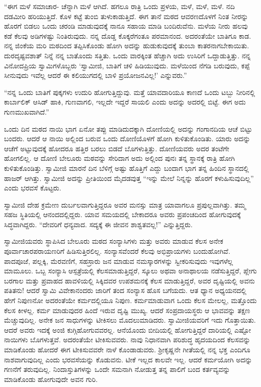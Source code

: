  “ಈಗ ಮಳೆ ಸಮಾಚಾರ- ಚೆನ್ನಾಗಿ ಮಳೆ ಆಗಿದೆ. ಹಗಲೂ ರಾತ್ರಿ ಒಂದು ಪ್ರಳಯ, ಮಳೆ, ಮಳೆ, ಮಳೆ. ನದಿ ದಡಮೀರಿ ಹರಿಯುತ್ತಿದೆ. ಕೊಳ ಕಟ್ಟೆ ತುಂಬಿ ತುಳುಕಾಡುತ್ತಿದೆ. ಈಗ ತಾನೆ ಮಠದ ಆವರಣದೊಳಗೆ ನಿಂತ ನೀರನ್ನು ಹೊರಗೆ ಬಿಡಲು ಒಂದು ಚರಂಡಿ ಮಾಡುವುದಕ್ಕೆ ನಾನೂ ಸಹಾಯ ಮಾಡಿ ಬಂದಿರುವೆನು. ಮಳೆಯ ನೀರು ಹಲವು ಕಡೆ ಕೆಲವು ಅಡಿಗಳಷ್ಟು ನಿಂತಿರುವುದು. ನನ್ನ ದೊಡ್ಡ ಕೊಕ್ಕರೆಗಂತೂ ಪರಮಾನಂದ. ಅದರಂತೆಯೇ ಬಾತಿಗೂ ಕಾಡ. ನನ್ನ ಜಿಂಕೆಯ ಮರಿ ಮಠದಿಂದ ತಪ್ಪಿಸಿಕೊಂಡು ಹೋಗಿ ಅದನ್ನು ಹುಡುಕುವುದಕ್ಕೆ ತುಂಬಾ ಕಾತರನಾಗಬೇಕಾಯಿತು. ದುರದೃಷ್ಟವಶಾತ್ ನಿನ್ನೆ ನನ್ನ ಬಾತೊಂದು ಸತ್ತಿತು. ಒಂದು ವಾರಕ್ಕಿಂತ ಹೆಚ್ಚಾಗಿ ಅದು ಉಸಿರಿಗೆ ಒದ್ದಾಡುತ್ತಿತ್ತು. ನನ್ನ ವಿನೋದಪ್ರಿಯ ಸ್ವಾಮಿಗಳೊಬ್ಬರು ‘ಸ್ವಾಮೀಜಿ, ಬಾತಿಗೆ ಚಳಿ ಹಿಡಿಯುವುದು. ಮಳೆಯಿಂದ ನೆಗಡಿ ಬರುವುದು, ಕಪ್ಪೆ ಸೀನುವುದು ಇವೆಲ್ಲ ಆದರೆ ಈ ಕಲಿಯುಗದಲ್ಲಿ ಬಾಳಿ ಪ್ರಯೋಜನವಿಲ್ಲ!’ ಎನ್ನುವರು.” 

 “ನನ್ನ ಒಂದು ಬಾತಿಗೆ ಪುಕ್ಕಗಳು ಉದುರಿ ಹೋಗುತ್ತಿದ್ದುವು. ಮತ್ತೆ ಯಾವದಾರಿಯೂ ಕಾಣದೆ ಒಂದು ಟಬ್ಬು ನೀರಿನಲ್ಲಿ ಕಾರ್ಬಾಲಿಕ್ ಆಸಿಡ್ ಹಾಕಿ, ಗುಣವಾಗಲಿ, ಇಲ್ಲದೇ ಇದ್ದರೆ ಸಾಯಲಿ ಎಂದು ಅದನ್ನು ಅದರಲ್ಲಿ ಬಿಟ್ಟೆ. ಈಗ ಅದು ಗುಣಮುಖವಾಗಿದೆ.” 

 ಒಂದು ದಿನ ಮಠದ ನಾಯಿ ಭಾಗ ಏನೋ ತಪ್ಪು ಮಾಡಿದುದಕ್ಕಾಗಿ ದೋಣಿಯಲ್ಲಿ ಅದನ್ನು ಗಂಗಾನದಿಯ ಆಚೆ ಬಿಟ್ಟು ಬಂದರು. ಆದರೆ ಆ ನಾಯಿ ಅಲ್ಲಿಂದ ಬರುವ ಒಂದು ದೋಣಿಯೊಳಗೆ ಹೋಗಿ ಕುಳಿತುಕೊಂಡಿತು. ಯಾರು ಅದನ್ನು ಆಚೆಗೆ ಅಟ್ಟುವುದಕ್ಕೆ ಹೋದರೂ ಹತ್ತಿರ ಬರಲು ಬಿಡದೆ ಬೊಗಳುತ್ತಿತ್ತು. ದೋಣಿಯವರು ಅದರ ತಂಟೆಗೇ ಹೋಗಲಿಲ್ಲ. ಆ ದೋಣಿ ಬೇಲೂರು ಮಠವನ್ನು ಸೇರಿದಾಗ ಅದು ಅಲ್ಲಿಂದ ಪುನಃ ತನ್ನ ಸ್ಥಾನಕ್ಕೆ ರಾತ್ರಿ ಹೋಗಿ ಕುಳಿತುಕೊಂಡಿತ್ತು. ಸ್ವಾಮೀಜಿ ಮಾರನೆ ದಿನ ಬೆಳಿಗ್ಗೆ ಅಷ್ಟು ಹೊತ್ತಿಗೆ ಎದ್ದು ಬಂದಾಗ ಭಾಗ ತನ್ನ ಹಿಂದಿನ ಸ್ಥಾನದಲ್ಲಿ ಹಾಜರ್ ಆಗಿತ್ತು. ಸ್ವಾಮೀಜಿ ಅದನ್ನು ಪ್ರೀತಿಯಿಂದ ಮೈದಡವುತ್ತ “ಇನ್ನು ಮೇಲೆ ನಿನ್ನನ್ನು ಹೊರಗೆ ಕಳುಹಿಸುವುದಿಲ್ಲ” ಎಂದು ಭರವಸೆ ಕೊಟ್ಟರು. 

 ಸ್ವಾಮೀಜಿ ದೇಹ ಕ್ರಮೇಣ ದುರ್ಬಲವಾಗುತ್ತಿದ್ದರೂ ಅವರ ಮನಸ್ಸು ಮಾತ್ರ ಯಾವಾಗಲೂ ಪ್ರಪುಲ್ಲವಾಗಿತ್ತು. ತಮ್ಮ ಸಹಜ ಸ್ಥಿತಿಯಲ್ಲಿ ಆನಂದದಲ್ಲಿದ್ದರು. ಯಾವ ಸಮಯದಲ್ಲಿ ಬೇಕಾದರೂ ಅವರು ಪ್ರಪಂಚದಿಂದ ಹೋಗುವುದಕ್ಕೆ ಸಿದ್ಧವಾಗಿದ್ದರು. “ದೇವರಿಗೆ ಧನ್ಯವಾದ. ಸದ್ಯಕ್ಕೆ ಈ ಜೀವನ ಶಾಶ್ವತವಲ್ಲ!” ಎನ್ನುತ್ತಿದ್ದರು. 

 ಸ್ವಾಮೀಜಿಯವರು ಸ್ಥಾಪಿಸಿದ ಬೇಲೂರು ಮಠದ ಸಂನ್ಯಾಸಿಗಳು ಮತ್ತು ಅವರು ಮಾಡುವ ಕೆಲಸ ಅನೇಕ ಪೂರ್ವಾಚಾರಪರಾಯಣರಿಗೆ ಹಿಡಿಸುತ್ತಿರಲಿಲ್ಲ. ಸಂನ್ಯಾಸವೆಂದರೆ ಕೆಲವು ಅಭಿಪ್ರಾಯಗಳು ಬಂದುಹೋಗಿವೆ. ಪಾದಪೂಜೆ, ಪಲ್ಲಕ್ಕಿ, ಮೆರವಣಿಗೆ, ಸಹಸ್ರಾರು ಜನ ಮಾಡುವ ನಮಸ್ಕಾರಗಳನ್ನು ಸ್ವೀಕರಿಸುವುದು ಇವುಗಳೆಲ್ಲ ಮಾಮೂಲು. ಒಬ್ಬ ಸಂನ್ಯಾಸಿ ಆಸ್ಪತ್ರೆಯಲ್ಲಿ ಕೆಲಸಮಾಡುತ್ತಿದ್ದರೆ, ಸ್ಕೂಲು ಅಥವಾ ಅನಾಥಾಲಯ ನಡೆಸುತ್ತಿದ್ದರೆ, ಪ್ಲೇಗು ಬರಗಾಲ ಮತ್ತು ಪ್ರವಾಹದ ಹಾವಳಿಯಲ್ಲಿ ಸಿಕ್ಕಿದವರ ಉಪಶಮನಕ್ಕೆ ಕೆಲಸ ಮಾಡುತ್ತಿದ್ದರೆ, ಅವರ ದೃಷ್ಟಿಯಲ್ಲಿ ಅವನು ಪತಿತನು! ಆದರೆ ಸ್ವಾಮಿ ವಿವೇಕಾನಂದರು ಜಾರಿಗೆ ತಂದ ಸಂನ್ಯಾಸ ಹೊಸ ಬಗೆಯದು. ಆತ ಧ್ಯಾನ ಅಧ್ಯಯನದಲ್ಲಿ ಹೇಗೆ ನಿಪುಣನೋ ಅದರಂತೆಯೇ ಕರ್ಮದಲ್ಲಿಯೂ ನಿಪುಣ. ಕರ್ಮಮಾಡುವಾಗ ಒಂದು ಕೆಲಸ ಮೇಲಲ್ಲ, ಮತ್ತೊಂದು ಕೆಲಸ ಕೀಳಲ್ಲ. ಕರ್ಮ ಮಾಡುವುದರ ಹಿಂದೆ ಇರುವ ದೃಷ್ಟಿ ಮುಖ್ಯ. ಆದರೆ ಸಂಪ್ರದಾಯಸ್ಥರು ಆ ಭಾವವನ್ನು ತಕ್ಷಣ ಮೆಚ್ಚುವುದಿಲ್ಲ. ಅನೇಕ ಜನ ಸಾಧುಗಳನ್ನು ಟೀಕಿಸಲು ಮೊದಲುಮಾಡಿದರು. ಸ್ವಾಮೀಜಿಯವರಿಗೆ ಇದು ಗೊತ್ತಾಯಿತು. ಆದರೆ ಅವರು ಇದಕ್ಕೆ ಅಂಜಿ ಕುಗ್ಗಿಹೋಗುವವರಲ್ಲ. ಆನೆಯೊಂದು ಬೀದಿಯಲ್ಲಿ ಹೋಗುತ್ತಿದ್ದರೆ ದಾರಿಯಲ್ಲಿ ಎಷ್ಟೋ ನಾಯಿಗಳು ಬೊಗಳುತ್ತವೆ. ಅದರಂತೆಯೇ ಟೀಕಿಸುವವರು. ನಾವು ನಿಧಾನವಾಗಿ ಪರಿಶುದ್ಧ ಹೃದಯದಿಂದ ಕೆಲಸವನ್ನು ಮಾಡಿಕೊಂಡು ಹೋದರೆ ಈಗ ಟೀಕಿಸುವವರೇ ನಾಳೆ ಕೊಂಡಾಡುವರು. ಶ‍್ರೀಕೃಷ್ಣನೇ ಗೀತೆಯಲ್ಲಿ ನನ್ನ ಭಕ್ತ ಎಂದಿಗೂ ನಾಶವಾಗುವುದಿಲ್ಲ ಎಂದು ಭರವಸೆಯನ್ನು ಕೊಡುವನು. ಟೀಕೆ ಇಲ್ಲದ ಕಾಲವೇ ಇಲ್ಲ. ಆದರೆ ಕರ್ಮಯೋಗಿ ಅದನ್ನು ಗಣನೆಗೆ ತರುವುದಿಲ್ಲ. ನಿಂದಾಸ್ತುತಿಗಳನ್ನು ಒಂದೇ ಸಮನಾಗಿ ನೋಡುತ್ತ ತನ್ನ ಪಾಲಿಗೆ ಬಂದ ಕರ್ತವ್ಯವನ್ನು ಮಾಡಿಕೊಂಡು ಹೋಗುವುದೇ ಅವನ ಗುರಿ. 

